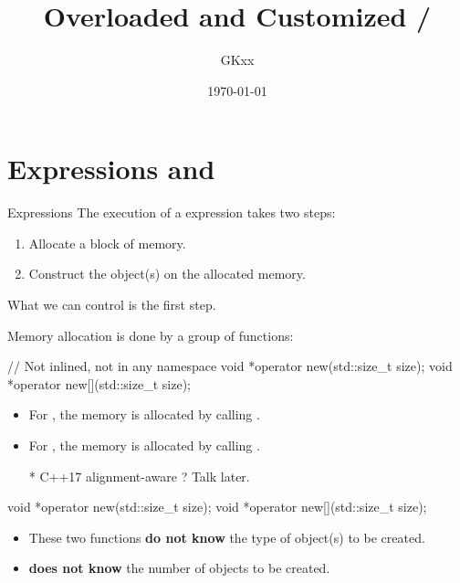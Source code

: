 \documentclass{beamer}
\title{Overloaded and Customized \ttt{new}/\ttt{delete}}
\author{GKxx}
\date{\today}
\begin{document}
\begin{frame}
	\maketitle
\end{frame}

\begin{frame}
  \tableofcontents
\end{frame}

\section{ Expressions and }

\begin{frame}{ Expressions}
  The execution of a  expression takes two steps:
  \begin{enumerate}
    \item Allocate a block of memory.
    \item Construct the object(s) on the allocated memory.
  \end{enumerate}
  What we can control is the first step.
\end{frame}

\begin{frame}[fragile]{}
  Memory allocation is done by a group of functions:
  \begin{cpp}
// Not inlined, not in any namespace
void *operator new(std::size_t size);
void *operator new[](std::size_t size);
  \end{cpp}
  \begin{itemize}
    \item For , the memory is allocated by calling .
    \item For , the memory is allocated by calling .
    \item[*]{\footnotesize C++17 alignment-aware ? Talk later.}
  \end{itemize}
\end{frame}

\begin{frame}[fragile]{}
  \begin{cpp}
void *operator new(std::size_t size);
void *operator new[](std::size_t size);
  \end{cpp}
  \begin{itemize}
    \item These two functions \textbf{do not know} the type of object(s) to be created.
    \item {} \textbf{does not know} the number of objects to be created.
  \end{itemize}
\end{frame}
\end{document}
